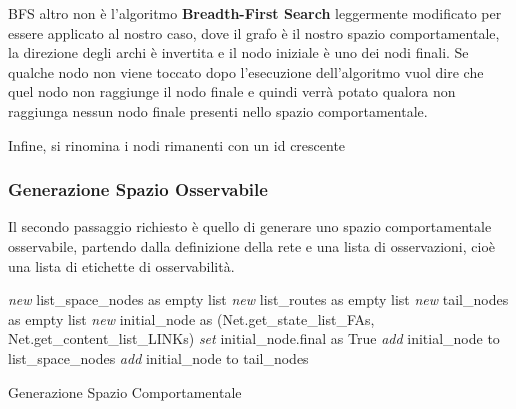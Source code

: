 BFS altro non è l'algoritmo \textbf{Breadth-First Search} leggermente modificato per essere applicato al nostro caso, dove il grafo è il nostro spazio comportamentale, la direzione degli archi è invertita e il nodo iniziale è uno dei nodi finali. Se qualche nodo non viene toccato dopo l'esecuzione dell'algoritmo vuol dire che quel nodo non raggiunge il nodo finale e quindi verrà potato qualora non raggiunga nessun nodo finale presenti nello spazio comportamentale.

Infine, si rinomina i nodi rimanenti con un id crescente
\subsubsection{Generazione Spazio Osservabile}
Il secondo passaggio richiesto è quello di generare uno spazio comportamentale osservabile, partendo dalla definizione della rete e una lista di osservazioni, cioè una lista di etichette di osservabilità.

\begin{algorithm}[H]
\SetAlgoLined
{}
 \textit{new} list\_space\_nodes as empty list\;
 \textit{new} list\_routes as empty list\;
 \textit{new} tail\_nodes as empty list\;
 \;
 \textit{new} initial\_node as (Net.get\_state\_list\_FAs, Net.get\_content\_list\_LINKs)\;
 \textit{set} initial\_node.final as True\;
 \textit{add} initial\_node to list\_space\_nodes\;
 \textit{add} initial\_node to tail\_nodes\;
 \caption{Generazione Spazio Comportamentale}
 \rememberlines
\end{algorithm}

